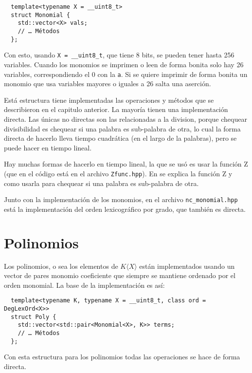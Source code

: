 \documentclass[12pt]{report}
\theoremstyle{customstyle}
\theoremstyle{factstyle}
\begin{document}
\begin{verbatim}
  template<typename X = __uint8_t>
  struct Monomial {
    std::vector<X> vals;
    // … Métodos
  };
\end{verbatim}

Con esto, usando \texttt{X = \_\_uint8\_t}, que tiene 8 bits, se pueden tener hasta 256 variables. Cuando los monomios se imprimen o leen de forma bonita solo hay 26 variables, correspondiendo el 0 con la \texttt{a}. Si se quiere imprimir de forma bonita un monomio que usa variables mayores o iguales a 26 salta una aserción.

Está estructura tiene implementadas las operaciones y métodos que se describieron en el capitulo anterior. La mayoría tienen una implementación directa. Las únicas no directas son las relacionadas a la division, porque chequear divisibilidad es chequear si una palabra es sub-palabra de otra, lo cual la forma directa de hacerlo lleva tiempo cuadrática (en el largo de la palabras), pero se puede hacer en tiempo lineal.

Hay muchas formas de hacerlo en tiempo lineal, la que se usó es usar la función Z (que en el código está en el archivo \texttt{Zfunc.hpp}). En \cite{web:cp-algo:Zfunc} se explica la función Z y como usarla para chequear si una palabra es sub-palabra de otra.

Junto con la implementación de los monomios, en el archivo \texttt{nc\_monomial.hpp} está la implementación del orden lexicográfico por grado, que también es directa.

\section{Polinomios}

Los polinomios, o sea los elementos de $K⟨X⟩$ están implementados usando un vector de pares monomio coeficiente que siempre se mantiene ordenado por el orden monomial. La base de la implementación es así:

\begin{verbatim}
  template<typename K, typename X = __uint8_t, class ord = DegLexOrd<X>>
  struct Poly {
    std::vector<std::pair<Monomial<X>, K>> terms;
    // … Métodos
  };
\end{verbatim}

Con esta estructura para los polinomios todas las operaciones se hace de forma directa.
\end{document}
